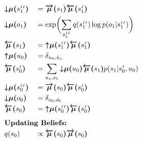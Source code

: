 \documentclass[fleqn]{article}
\begin{document}
\begin{minipage}[t]{0.5\textwidth}
    \begin{alignat}{2}
         & \bm{{\downarrow}{\mu}(}s^{\scriptscriptstyle II}_1\bm{)}  &  & = \bm{\overrightarrow{\mu}(}s_1\bm{)} \bm{\overleftarrow{\mu}(}s^{\scriptscriptstyle I}_1\bm{)}                                  \\
         & \bm{{\downarrow}{\mu}(}o_1\bm{)}                          &  & = \exp \biggl( \sum_{s^{\scriptscriptstyle II}_1} q(s^{\scriptscriptstyle II}_1) \log p(o_1|s^{\scriptscriptstyle II}_1) \biggr) \\
         & \bm{\overleftarrow{\mu}(}s_1\bm{)}                        &  & = \bm{{\uparrow}{\mu}(}s^{\scriptscriptstyle II}_1\bm{)} \bm{\overleftarrow{\mu}(}s^{\scriptscriptstyle I}_1\bm{)}               \\
         & \bm{{\uparrow}{\mu}(}u_0\bm{)}                            &  & = \delta_{u_0, \hat{u}_o}                                                                                                        \\
         & \bm{\overleftarrow{\mu}(}s^{\scriptscriptstyle I}_0\bm{)} &  & = \sum_{u_o, s_1} \bm{{\downarrow}{\mu}(}u_0\bm{)} \bm{\overleftarrow{\mu}(}s_1\bm{)} p(s_1|s^{\scriptscriptstyle I}_0,u_0)      \\
         & \bm{{\downarrow}{\mu}(}s^{\scriptscriptstyle II}_0\bm{)}  &  & = \bm{\overrightarrow{\mu}(}s_0\bm{)} \bm{\overleftarrow{\mu}(}s^{\scriptscriptstyle I}_0\bm{)}                                  \\
         & \bm{{\downarrow}{\mu}(}o_0\bm{)}                          &  & = \delta_{o_0, \hat{o_0}}                                                                                                        \\
         & \bm{\overleftarrow{\mu}(}s_0\bm{)}                        &  & = \bm{{\uparrow}{\mu}(}s^{\scriptscriptstyle II}_0\bm{)} \bm{\overleftarrow{\mu}(}s^{\scriptscriptstyle I}_0\bm{)}               \\[0.5em]
         & \rlap{\text{\bfseries Updating Beliefs:}} \nonumber                                                                                                                                             \\
         & q(s_0)                                                    &  & \propto \bm{\overleftarrow{\mu}(}s_0\bm{)} \bm{\overrightarrow{\mu}(}s_0\bm{)}                                                   \\

\end{alignat}
\end{minipage}
\end{document}
